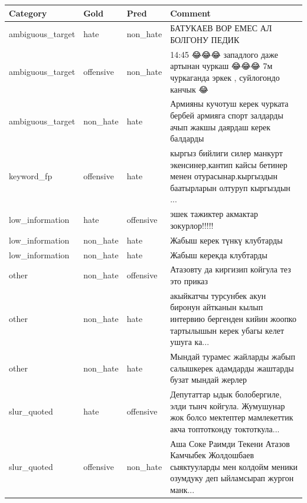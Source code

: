 \begin{tabular}{lllp{}}
\toprule
Category & Gold & Pred & Comment \\
\midrule
ambiguous_target & hate & non_hate & БАТУКАЕВ ВОР ЕМЕС АЛ БОЛГОНУ ПЕДИК \\
ambiguous_target & offensive & non_hate & 14:45 😂😂😂 западлого даже артынан чуркаш 😂😂😂 7м чуркаганда эркек , суйлогондо канчык 😂 \\
ambiguous_target & non_hate & hate & Армияны кучотуш керек чурката бербей армияга спорт залдарды ачып жакшы даярдаш керек балдарды \\
keyword_fp & offensive & hate & кыргыз бийлиги силер манкурт экенсинер,кантип кайсы бетинер менен отурасынар.кыргыздын баатырларын олтуруп кыргыздын ... \\
low_information & hate & offensive & эшек тажиктер акмактар зокурлор!!!!! \\
low_information & non_hate & hate & Жабыш керек түнкү клубтарды \\
low_information & non_hate & hate & Жабыш керекда клубтарды \\
other & non_hate & offensive & Атазовту да киргизип койгула тез это приказ \\
other & non_hate & hate & акыйкатчы турсунбек акун биронун айтканын кылып интервию бергенден кийин жоопко тартылышын керек убагы келет ушуга ка... \\
other & non_hate & hate & Мындай турамес жайларды жабып салышкерек адамдарды жаштарды бузат мындай жерлер \\
slur_quoted & hate & offensive & Депутаттар ыдык болобергиле, элди тынч койгула. Жумушунар жок болсо мектептер мамлекеттик акча топтотконду токтоткула... \\
slur_quoted & offensive & non_hate & Аша Соке Раимди Текени Атазов Камчыбек Жолдошбаев сыяктууларды мен колдойм меники озумдуку деп ыйламсырап жургон манк... \\
\bottomrule
\end{tabular}